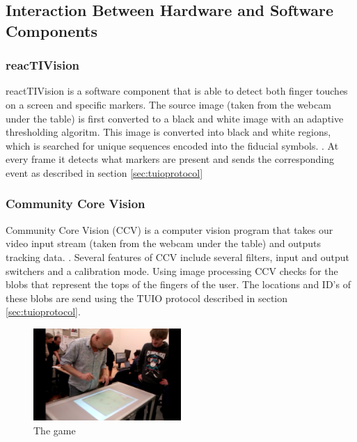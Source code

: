 \documentclass[a4paper,10pt]{article}
\begin{document}
	\subsection{Interaction Between Hardware and Software Components}

	\subsubsection{reacTIVision}
	\label{sec:reactivision}
	reactTIVision is a software component that is able to detect both finger touches on a screen and specific markers. 
	The source image (taken from the webcam under the table) is first converted to a black and white image with an adaptive thresholding algoritm. 
	This image is converted into black and white regions, which is searched for unique sequences encoded into the fiducial symbols. \cite{reactivision}.
	At every frame it detects what markers are present and sends the corresponding event as described in section \ref{sec:tuioprotocol}

	\subsubsection{Community Core Vision}
	\label{sec:communitycorevision}	
			Community Core Vision (CCV) is a computer vision program that takes our video input stream (taken from the webcam under the table) and outputs tracking data. \cite{ccv}.
		    	Several features of CCV include several filters, input and output switchers and a calibration mode. 
			Using image processing CCV checks for the blobs that represent the tops of the fingers of the user. 
			The locations and ID's of these blobs are send using the TUIO protocol described in section \ref{sec:tuioprotocol}.
			\begin{figure}[h!]
			  \caption{The game}
			  \centering
			  \includegraphics[width=0.5\textwidth]{images/tafelgebruik}
			\end{figure}
		
\end{document}
